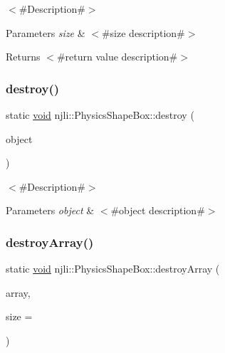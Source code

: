 $<$\#\+Description\#$>$


\begin{DoxyParams}{Parameters}
{\em size} & $<$\#size description\#$>$\\
\hline
\end{DoxyParams}
\begin{DoxyReturn}{Returns}
$<$\#return value description\#$>$ 
\end{DoxyReturn}
\mbox{\label{classnjli_1_1_physics_shape_box_af2cedff97d4c5d4f4c9b48b747151edc}} 
\subsubsection{\texorpdfstring{destroy()}{destroy()}}
{\footnotesize\ttfamily static \mbox{\hyperlink{_thread_8h_af1e856da2e658414cb2456cb6f7ebc66}{void}} njli\+::\+Physics\+Shape\+Box\+::destroy (\begin{DoxyParamCaption}\item[{\mbox{\hyperlink{classnjli_1_1_physics_shape_box}{Physics\+Shape\+Box}} $\ast$}]{object }\end{DoxyParamCaption})\hspace{0.3cm}{\ttfamily [static]}}

$<$\#\+Description\#$>$


\begin{DoxyParams}{Parameters}
{\em object} & $<$\#object description\#$>$ \\
\hline
\end{DoxyParams}
\mbox{\label{classnjli_1_1_physics_shape_box_a6d55d7d82a7670804d59a2b8f78f649d}} 
\subsubsection{\texorpdfstring{destroy\+Array()}{destroyArray()}}
{\footnotesize\ttfamily static \mbox{\hyperlink{_thread_8h_af1e856da2e658414cb2456cb6f7ebc66}{void}} njli\+::\+Physics\+Shape\+Box\+::destroy\+Array (\begin{DoxyParamCaption}\item[{\mbox{\hyperlink{classnjli_1_1_physics_shape_box}{Physics\+Shape\+Box}} $\ast$$\ast$}]{array,  }\item[{const \mbox{\hyperlink{_util_8h_a10e94b422ef0c20dcdec20d31a1f5049}{u32}}}]{size = {} }\end{DoxyParamCaption})\hspace{0.3cm}{\ttfamily [static]}}

